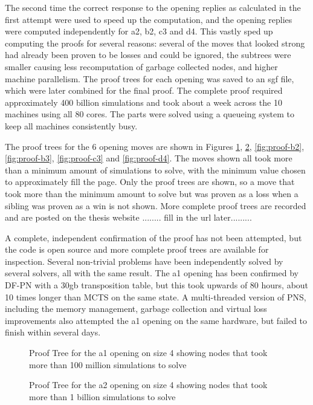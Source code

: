 The second time the correct response to the opening replies as calculated in the first attempt were used to speed up the computation, and the opening replies were computed independently for a2, b2, c3 and d4. This vastly sped up computing the proofs for several reasons: several of the moves that looked strong had already been proven to be losses and could be ignored, the subtrees were smaller causing less recomputation of garbage collected nodes, and higher machine parallelism. The proof trees for each opening was saved to an sgf file, which were later combined for the final proof. The complete proof required approximately 400 billion simulations and took about a week across the 10 machines using all 80 cores. The parts were solved using a queueing system to keep all machines consistently busy.

The proof trees for the 6 opening moves are shown in Figures \ref{fig:proof-a1}, \ref{fig:proof-a2}, \ref{fig:proof-b2}, \ref{fig:proof-b3}, \ref{fig:proof-c3} and \ref{fig:proof-d4}. The moves shown all took more than a minimum amount of simulations to solve, with the minimum value chosen to approximately fill the page. Only the proof trees are shown, so a move that took more than the minimum amount to solve but was proven as a loss when a sibling was proven as a win is not shown. More complete proof trees are recorded and are posted on the thesis website ........ fill in the url later.........

A complete, independent confirmation of the proof has not been attempted, but the code is open source and more complete proof trees are available for inspection. Several non-trivial problems have been independently solved by several solvers, all with the same result. The a1 opening has been confirmed by DF-PN with a 30gb transposition table, but this took upwards of 80 hours, about 10 times longer than MCTS on the same state. A multi-threaded version of PNS, including the memory management, garbage collection and virtual loss improvements also attempted the a1 opening on the same hardware, but failed to finish within several days.

\begin{figure}
\centering

\caption{Proof Tree for the a1 opening on size 4 showing nodes that took more than 100 million simulations to solve}
\label{fig:proof-a1}
\end{figure}

\begin{figure}
\centering

\caption{Proof Tree for the a2 opening on size 4 showing nodes that took more than 1 billion simulations to solve}
\label{fig:proof-a2}
\end{figure}

